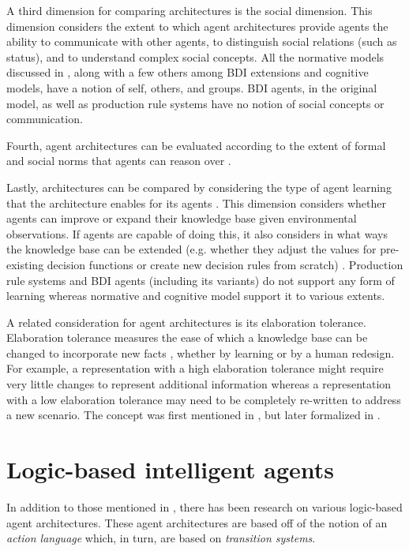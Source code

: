 A third dimension for comparing architectures is the social dimension.
This dimension considers the extent to which agent architectures provide agents the ability to communicate with other agents, to distinguish social relations (such as status), and to understand complex social concepts.
All the normative models discussed in \cite{balke_how_2014}, along with a few others among BDI extensions and cognitive models, have a notion of self, others, and groups.
BDI agents, in the original model, as well as production rule systems have no notion of social concepts or communication.

Fourth, agent architectures can be evaluated according to the extent of formal and social norms that agents can reason over \cite{balke_how_2014}.

Lastly, architectures can be compared by considering the type of agent learning that the architecture enables for its agents \cite{balke_how_2014}.
This dimension considers whether agents can improve or expand their knowledge base given environmental observations.
If agents are capable of doing this, it also considers in what ways the knowledge base can be extended (e.g. whether they adjust the values for pre-existing decision functions or create new decision rules from scratch) \cite{balke_how_2014}.
Production rule systems and BDI agents (including its variants) do not support any form of learning whereas normative and cognitive model support it to various extents.

A related consideration for agent architectures is its elaboration tolerance.
Elaboration tolerance measures the ease of which a knowledge base can be changed to incorporate new facts \cite{parmar_formalizing_2003}, whether by learning or by a human redesign.
For example, a representation with a high elaboration tolerance might require very little changes to represent additional information whereas a representation with a low elaboration tolerance may need to be completely re-written to address a new scenario.
The concept was first mentioned in \cite{mccarthy_mathematical_1988}, but later formalized in \cite{parmar_formalizing_2003}.

\section{Logic-based intelligent agents}
\label{sec:logic_based_agents}

In addition to those mentioned in \cite{balke_how_2014}, there has been research on various logic-based agent architectures.
These agent architectures are based off of the notion of an \textit{action language} which, in turn, are based on \textit{transition systems}.

